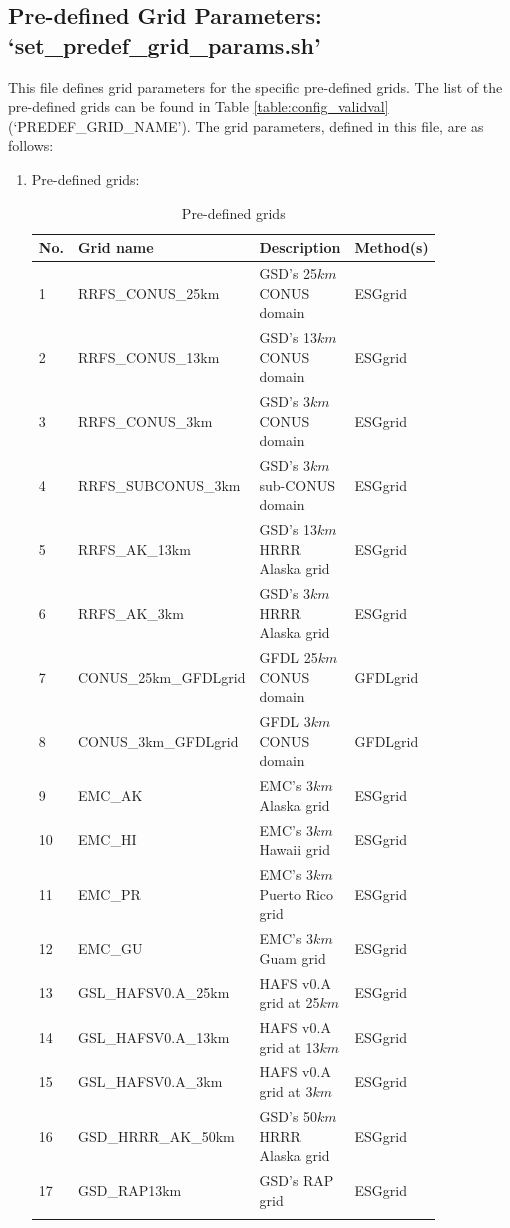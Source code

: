 \documentclass[11pt,fleqn]{report}              %
\begin{document}
\subsection{Pre-defined Grid Parameters: `set\_predef\_grid\_params.sh'}
\label{subsec:wflow_predef_grid_parm}

This file defines grid parameters for the specific pre-defined grids. The list of the pre-defined grids can be found in Table \ref{table:config_validval} (`PREDEF\_GRID\_NAME'). The grid parameters, defined in this file, are as follows:

\begin{enumerate}
\item Pre-defined grids:
{
\fontsize{10}{12}\selectfont
\begin{longtable}{p{0.03\linewidth} | p{0.26\linewidth} | p{0.35\linewidth} | p{0.2\linewidth}   }
\hline
\hline
No. & Grid name & Description  & Method(s) \\
\hline
1 & RRFS\_CONUS\_25km & GSD's 25$km$ CONUS domain & ESGgrid \\
2 & RRFS\_CONUS\_13km & GSD's 13$km$ CONUS domain & ESGgrid \\
3 & RRFS\_CONUS\_3km & GSD's 3$km$ CONUS domain & ESGgrid \\
4 & RRFS\_SUBCONUS\_3km & GSD's 3$km$ sub-CONUS domain & ESGgrid \\
5 & RRFS\_AK\_13km & GSD's 13$km$ HRRR Alaska grid & ESGgrid \\
6 & RRFS\_AK\_3km & GSD's 3$km$ HRRR Alaska grid & ESGgrid \\
7 & CONUS\_25km\_GFDLgrid & GFDL 25$km$ CONUS domain & GFDLgrid \\
8 & CONUS\_3km\_GFDLgrid & GFDL 3$km$ CONUS domain & GFDLgrid \\
9 & EMC\_AK & EMC's 3$km$ Alaska grid & ESGgrid \\
10 & EMC\_HI & EMC's 3$km$ Hawaii grid & ESGgrid \\
11 & EMC\_PR & EMC's 3$km$ Puerto Rico grid & ESGgrid \\
12 & EMC\_GU & EMC's 3$km$ Guam grid & ESGgrid \\
13 & GSL\_HAFSV0.A\_25km & HAFS v0.A grid at 25$km$ & ESGgrid \\
14 & GSL\_HAFSV0.A\_13km & HAFS v0.A grid at 13$km$ & ESGgrid \\
15 & GSL\_HAFSV0.A\_3km & HAFS v0.A grid at 3$km$ &  ESGgrid \\
16 & GSD\_HRRR\_AK\_50km & GSD's 50$km$ HRRR Alaska grid & ESGgrid \\
17 & GSD\_RAP13km & GSD's RAP grid & ESGgrid \\
\hline
\caption{Pre-defined grids}
\label{table:predefined_grids}
\end{longtable}
}


\end{enumerate}
\end{document}
